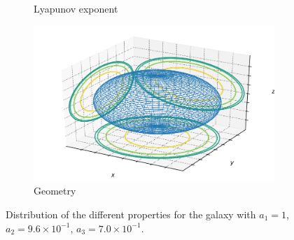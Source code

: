 \begin{figure}[h]
\begin{subfigure}[t]{0.4\textwidth}
        \caption{Lyapunov exponent}
    \end{subfigure}
    \begin{subfigure}[t]{0.4\textwidth}
        \includegraphics[width=\textwidth]{"../Files/Week 13/images/10_ellipsoid"}
        \caption{Geometry}
    \end{subfigure}
    \caption{Distribution of the different properties for the galaxy with $a_1 = 1$, $a_2 = 9.6\times10^{-1}$, $a_3 = 7.0\times10^{-1}$.}
\end{figure}


